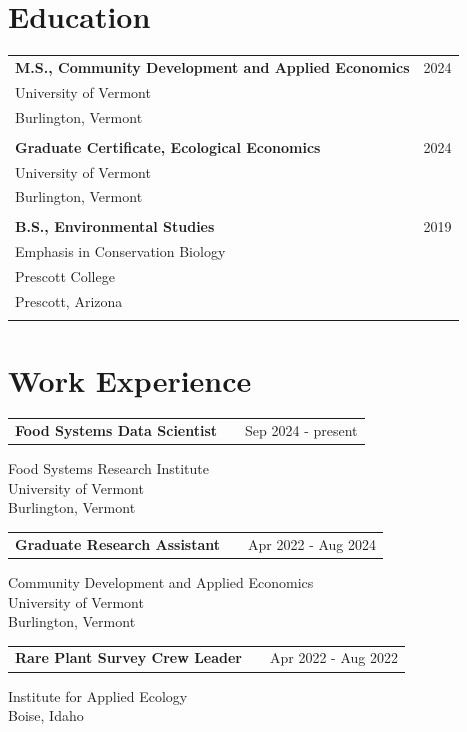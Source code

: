 \documentclass[a4paper,12pt]{article}
\makeatletter
\newenvironment{jobshort}[2]
    {
    \begin{tabularx}{\linewidth}{@{}l X r@{}}
    \textbf{#1} & \hfill &  #2 \\[3.75pt]
    \end{tabularx}
    }
    {
    }
\makeatother
\begin{document}
\section{Education}
\begin{tabularx}{\linewidth}{@{}l X@{}}
    \textbf{M.S., Community Development and Applied Economics} & \hfill 2024 \\ University of Vermont \\ Burlington, Vermont \\ \\
    \textbf{Graduate Certificate, Ecological Economics}        & \hfill 2024 \\ University of Vermont \\ Burlington, Vermont \\ \\
    \textbf{B.S., Environmental Studies}                       & \hfill 2019 \\ Emphasis in Conservation Biology \\ Prescott College \\ Prescott, Arizona \\ \\
\end{tabularx}


\section{Work Experience}
\begin{jobshort}{Food Systems Data Scientist}{Sep 2024 - present}
    Food Systems Research Institute \\
    University of Vermont \\ Burlington, Vermont \\
\end{jobshort}

\begin{jobshort}{Graduate Research Assistant}{Apr 2022 - Aug 2024}
    Community Development and Applied Economics \\
    University of Vermont \\ Burlington, Vermont \\
\end{jobshort}

\begin{jobshort}{Rare Plant Survey Crew Leader}{Apr 2022 - Aug 2022}
    Institute for Applied Ecology \\ Boise, Idaho \\
\end{jobshort}
\end{document}

